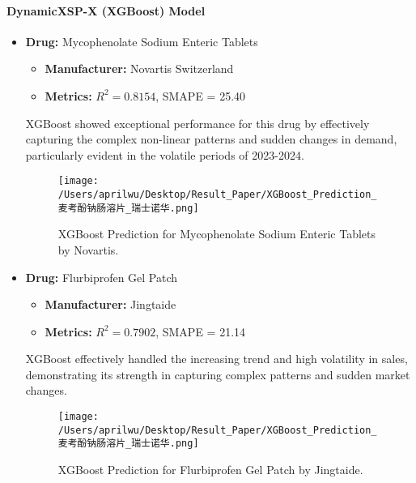 \documentclass[journal]{IEEEtran}
\begin{document}
\paragraph{DynamicXSP-X (XGBoost) Model} %
\begin{itemize}
\item \textbf{Drug:} Mycophenolate Sodium Enteric Tablets
\begin{itemize}
\item \textbf{Manufacturer:} Novartis Switzerland
\item \textbf{Metrics:} $R^2 = 0.8154$, SMAPE = 25.40
\end{itemize}
XGBoost showed exceptional performance for this drug by effectively capturing the complex non-linear patterns and sudden changes in demand, particularly evident in the volatile periods of 2023-2024.
\begin{figure}[H]
\centering
\texttt{[image: /Users/aprilwu/Desktop/Result\_Paper/XGBoost\_Prediction\_麦考酚钠肠溶片\_瑞士诺华.png]}
\caption{XGBoost Prediction for Mycophenolate Sodium Enteric Tablets by Novartis.}
\label{fig:mycophenolate}
\end{figure}
\item \textbf{Drug:} Flurbiprofen Gel Patch
\begin{itemize}
\item \textbf{Manufacturer:} Jingtaide
\item \textbf{Metrics:} $R^2 = 0.7902$, SMAPE = 21.14
\end{itemize}
XGBoost effectively handled the increasing trend and high volatility in sales, demonstrating its strength in capturing complex patterns and sudden market changes.
\begin{figure}[H]
\centering
\texttt{[image: /Users/aprilwu/Desktop/Result\_Paper/XGBoost\_Prediction\_麦考酚钠肠溶片\_瑞士诺华.png]}
\caption{XGBoost Prediction for Flurbiprofen Gel Patch by Jingtaide.}
\label{fig:flurbiprofen}
\end{figure}
\end{itemize}
\end{document}
